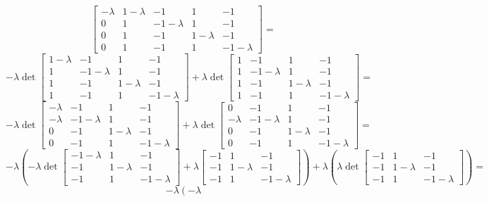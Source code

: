 \documentclass[11pt,a4paper]{article}
\begin{document}
{\[\begin{bmatrix}
-\lambda & 1-\lambda & -1 & 1 & -1 \\
0 & 1 & -1-\lambda & 1 & -1 \\
0 & 1 & -1 & 1-\lambda & -1 \\
0 & 1 & -1 & 1 & -1-\lambda
\end{bmatrix} = \]\[ - \lambda \det \begin{bmatrix}
 1-\lambda & -1 & 1 & -1 \\
 1 & -1-\lambda & 1 & -1 \\
 1 & -1 & 1-\lambda & -1 \\
 1 & -1 & 1 & -1-\lambda
\end{bmatrix}  + \lambda \det \begin{bmatrix}
1 & -1 & 1 & -1 \\
1 & -1-\lambda & 1 & -1 \\
1 & -1 & 1-\lambda & -1 \\
1 & -1 & 1 & -1-\lambda
\end{bmatrix} = \]\[
- \lambda \det \begin{bmatrix}
-\lambda & -1 & 1 & -1 \\
-\lambda & -1-\lambda & 1 & -1 \\
0 & -1 & 1-\lambda & -1 \\
0 & -1 & 1 & -1-\lambda
\end{bmatrix}  + \lambda \det \begin{bmatrix}
0 & -1 & 1 & -1 \\
-\lambda & -1-\lambda & 1 & -1 \\
0 & -1 & 1-\lambda & -1 \\
0 & -1 & 1 & -1-\lambda
\end{bmatrix} = \]\[ - \lambda \left( -\lambda
\det \begin{bmatrix}
 -1-\lambda & 1 & -1 \\
 -1 & 1-\lambda & -1 \\
 -1 & 1 & -1-\lambda
\end{bmatrix} + \lambda \begin{bmatrix}
-1 & 1 & -1 \\
-1 & 1-\lambda & -1 \\
-1 & 1 & -1-\lambda
\end{bmatrix} \right)
+ \lambda \left(  \lambda   \det \begin{bmatrix}
-1 & 1 & -1 \\
-1 & 1-\lambda & -1 \\
-1 & 1 & -1-\lambda
\end{bmatrix}  \right) = \]\[  - \lambda \left( -\lambda
\]}
\end{document}
